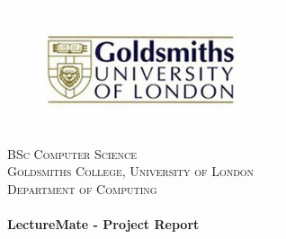 \documentclass[oneside]{report}
\begin{document}
\begin{titlepage}


\center
\includegraphics[width=8cm]{logo1.jpg}\\[1cm] %
 

\center %


\textsc{\LARGE BSc Computer Science}\\[1.5cm] %
\textsc{\Large Goldsmiths College, University of London}\\[0.5cm] %
\textsc{\large Department of Computing}\\[0.5cm] %

\makeatletter
\HRule \\[0.4cm]
\LARGE \textbf{LectureMate - Project Report}\\[0.4cm] %
\HRule \\[1.5cm]
 


\end{titlepage}
\end{document}
